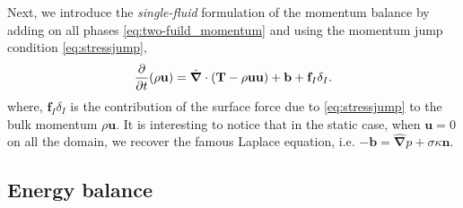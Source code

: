Next, we introduce the \textit{single-fluid} formulation of the momentum balance by adding on all phases \ref{eq:two-fuild_momentum} and using the momentum jump condition \ref{eq:stressjump}, 
\begin{equation}
   \frac{\partial}{\partial t} (\rho \textbf{u})
    = \hat{\bm{\nabla}} \cdot (\textbf{T} -\rho  \textbf{u} \textbf{u})
    + \textbf{b}
    + \textbf{f}_I\delta_I.
    \label{eq:one-fuild_momentum}
\end{equation}
where, $\textbf{f}_I\delta_I$ is the contribution of the surface force due to \ref{eq:stressjump} to the bulk momentum $\rho \textbf{u}$. 
It is interesting to notice that in the static case, when $\textbf{u}=0$ on all the domain, we recover the famous Laplace equation, i.e. $ -\bm{b} = \hat{\bm{\nabla}}p +\sigma \kappa \textbf{n} $.

\subsection{Energy balance}

